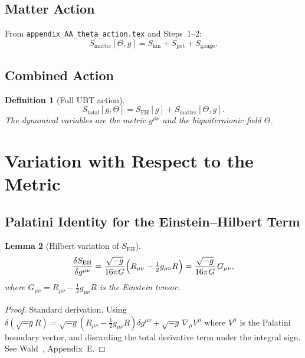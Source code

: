 \documentclass[12pt]{article}
\newtheorem{definition}{Definition}[section]
\newtheorem{lemma}[definition]{Lemma}
\begin{document}
\subsection{Matter Action}

From \texttt{appendix\_AA\_theta\_action.tex} and Steps~1--2:
\begin{equation}
  \label{eq:S_matter}
  S_{\mathrm{matter}}[\Theta, g]
  = S_{\mathrm{kin}} + S_{\mathrm{pot}} + S_{\mathrm{gauge}}.
\end{equation}

\subsection{Combined Action}

\begin{definition}[Full UBT action]
\label{def:S_total}
\begin{equation}
  \label{eq:S_total}
  S_{\mathrm{total}}[g, \Theta]
  = S_{\mathrm{EH}}[g] + S_{\mathrm{matter}}[\Theta, g].
\end{equation}
The dynamical variables are the metric $g^{\mu\nu}$ and the biquaternionic
field $\Theta$.
\end{definition}

\section{Variation with Respect to the Metric}

\subsection{Palatini Identity for the Einstein--Hilbert Term}

\begin{lemma}[Hilbert variation of $S_{\mathrm{EH}}$]
\label{lem:EH_var}
\begin{equation}
  \label{eq:var_EH}
  \frac{\delta S_{\mathrm{EH}}}{\delta g^{\mu\nu}}
  = \frac{\sqrt{-g}}{16\pi G}
    \Bigl(R_{\mu\nu} - \tfrac{1}{2}g_{\mu\nu}R\Bigr)
  = \frac{\sqrt{-g}}{16\pi G}\,G_{\mu\nu},
\end{equation}
where $G_{\mu\nu} = R_{\mu\nu} - \tfrac{1}{2}g_{\mu\nu}R$ is the Einstein tensor.
\end{lemma}

\begin{proof}
  Standard derivation.  Using $\delta(\sqrt{-g}R) = \sqrt{-g}
  (R_{\mu\nu} - \tfrac{1}{2}g_{\mu\nu}R)\delta g^{\mu\nu}
  + \sqrt{-g}\,\nabla_\mu V^\mu$ where $V^\mu$ is the Palatini boundary
  vector, and discarding the total derivative term under the integral sign.
  See Wald~\cite{wald}, Appendix~E.
\end{proof}
\end{document}
